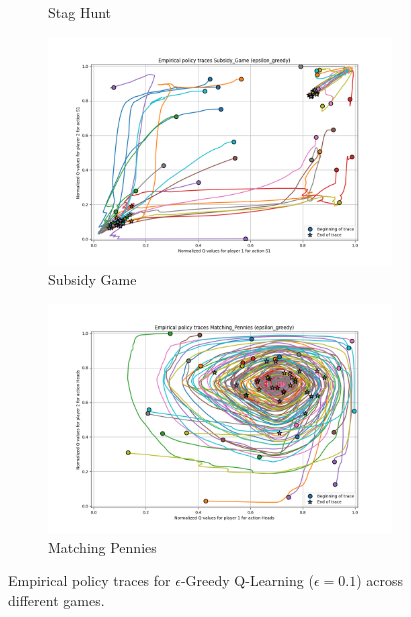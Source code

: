\documentclass[12pt,a4paper, onecolumn]{exam}
\begin{document}
\begin{appendices}
\begin{figure}[H]
\begin{subfigure}{0.44\textwidth}
            \caption{Stag Hunt}
        \end{subfigure}
        \vspace{0.5cm}
        \begin{subfigure}{0.44\textwidth}
            \centering
            \includegraphics[width=\linewidth]{plots/replicator_trajectoreis_Subsidy_Game_epsilon_greedy.png}
            \caption{Subsidy Game}
        \end{subfigure}
        \hfill
        \begin{subfigure}{0.44\textwidth}
            \centering
            \includegraphics[width=\linewidth]{plots/replicator_trajectoreis_Matching_Pennies_epsilon_greedy.png}
            \caption{Matching Pennies}
        \end{subfigure}
        \caption{Empirical policy traces for $\epsilon$-Greedy Q-Learning ($\epsilon=0.1$) across different games.}
        \label{fig:app_epsilon_greedy_combined}
    \end{figure}


\end{appendices}
\end{document}
